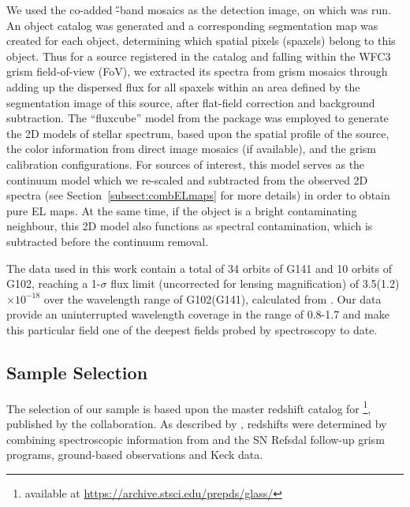 We used the co-added \H-band mosaics as the detection image, on which \sex
was run. An object catalog was generated and a
corresponding segmentation map was created for each object,
determining which spatial pixels (spaxels) belong to this object. Thus for a source
registered in the catalog and falling within the WFC3 grism field-of-view (FoV), we
extracted its spectra from grism mosaics through adding up the
dispersed flux for all spaxels within an area defined by the
segmentation image of this source, after flat-field correction and
background subtraction.  The ``fluxcube'' model from the \axe package
\citep{Kummel:2009dn} was employed to generate the 2D models of stellar
spectrum, based upon the spatial profile of the source, the color
information from direct image mosaics (if available), and the grism
calibration configurations.  For sources of interest, this model
serves as the continuum model which we re-scaled and subtracted from
the observed 2D spectra (see Section~\ref{subsect:combELmaps} for more
details) in order to obtain pure EL maps. At the same time, if the object is a bright contaminating neighbour,
this 2D model also functions as spectral contamination, which is subtracted before the continuum removal.

The data used in this work contain a total of 34 orbits of G141 and 10 orbits of G102,
reaching a 1-$\sigma$ flux limit (uncorrected for lensing magnification) of 3.5(1.2)$\times$$10^{-18}$ \Funit over the wavelength
range of G102(G141), calculated from \citet{Schmidt:2016ez}. Our data provide an uninterrupted wavelength coverage in the range of
0.8-1.7 \micron and make this particular field one of the deepest fields probed by \hst spectroscopy to date.

\subsection{Sample Selection}\label{subsect:srcselect}



The selection of our \mg sample is based upon the master redshift
catalog for \clyi\footnote{available at \url{https://archive.stsci.edu/prepds/glass/}}, published by the \glass collaboration.
As described by \citet{2015arXiv151005750T}, redshifts were determined by combining
spectroscopic information from \glass and the SN Refsdal follow-up \hst
grism programs, ground-based \muse observations and Keck \deimos data.

